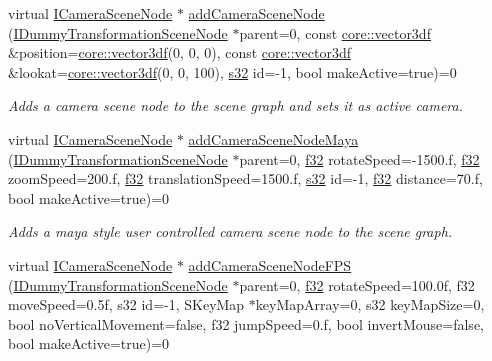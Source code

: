 \begin{DoxyCompactItemize}
\item 
virtual \hyperlink{classirr_1_1scene_1_1ICameraSceneNode}{I\+Camera\+Scene\+Node} $\ast$ \hyperlink{classirr_1_1scene_1_1ISceneManager_a6d8f9930cfbd4469ebfd798ba1e65db8}{add\+Camera\+Scene\+Node} (\hyperlink{classirr_1_1scene_1_1IDummyTransformationSceneNode}{I\+Dummy\+Transformation\+Scene\+Node} $\ast$parent=0, const \hyperlink{namespaceirr_1_1core_a06f169d08b5c429f5575acb7edbad811}{core\+::vector3df} \&position=\hyperlink{namespaceirr_1_1core_a06f169d08b5c429f5575acb7edbad811}{core\+::vector3df}(0, 0, 0), const \hyperlink{namespaceirr_1_1core_a06f169d08b5c429f5575acb7edbad811}{core\+::vector3df} \&lookat=\hyperlink{namespaceirr_1_1core_a06f169d08b5c429f5575acb7edbad811}{core\+::vector3df}(0, 0, 100), \hyperlink{namespaceirr_ac66849b7a6ed16e30ebede579f9b47c6}{s32} id=-\/1, bool make\+Active=true)=0
\begin{DoxyCompactList}\small\item\em Adds a camera scene node to the scene graph and sets it as active camera. \end{DoxyCompactList}\item 
virtual \hyperlink{classirr_1_1scene_1_1ICameraSceneNode}{I\+Camera\+Scene\+Node} $\ast$ \hyperlink{classirr_1_1scene_1_1ISceneManager_adc6cafb1f284dea325e9511917cb1f14}{add\+Camera\+Scene\+Node\+Maya} (\hyperlink{classirr_1_1scene_1_1IDummyTransformationSceneNode}{I\+Dummy\+Transformation\+Scene\+Node} $\ast$parent=0, \hyperlink{namespaceirr_a0277be98d67dc26ff93b1a6a1d086b07}{f32} rotate\+Speed=-\/1500.f, \hyperlink{namespaceirr_a0277be98d67dc26ff93b1a6a1d086b07}{f32} zoom\+Speed=200.f, \hyperlink{namespaceirr_a0277be98d67dc26ff93b1a6a1d086b07}{f32} translation\+Speed=1500.f, \hyperlink{namespaceirr_ac66849b7a6ed16e30ebede579f9b47c6}{s32} id=-\/1, \hyperlink{namespaceirr_a0277be98d67dc26ff93b1a6a1d086b07}{f32} distance=70.f, bool make\+Active=true)=0
\begin{DoxyCompactList}\small\item\em Adds a maya style user controlled camera scene node to the scene graph. \end{DoxyCompactList}\item 
virtual \hyperlink{classirr_1_1scene_1_1ICameraSceneNode}{I\+Camera\+Scene\+Node} $\ast$ \hyperlink{classirr_1_1scene_1_1ISceneManager_a0ad89f90e140ec8f26ec54c9b8f3d81c}{add\+Camera\+Scene\+Node\+F\+PS} (\hyperlink{classirr_1_1scene_1_1IDummyTransformationSceneNode}{I\+Dummy\+Transformation\+Scene\+Node} $\ast$parent=0, \hyperlink{namespaceirr_a0277be98d67dc26ff93b1a6a1d086b07}{f32} rotate\+Speed=100.\+0f, f32 move\+Speed=0.\+5f, s32 id=-\/1, S\+Key\+Map $\ast$key\+Map\+Array=0, s32 key\+Map\+Size=0, bool no\+Vertical\+Movement=false, f32 jump\+Speed=0.\+f, bool invert\+Mouse=false, bool make\+Active=true)=0

\end{DoxyCompactItemize}
